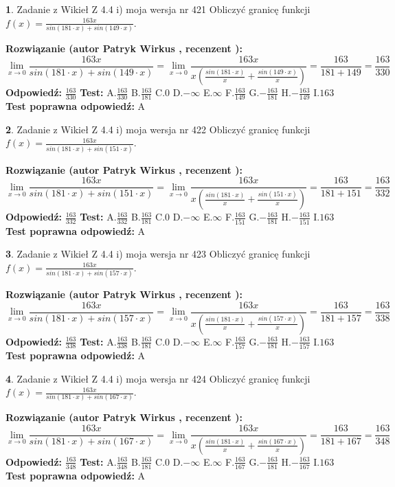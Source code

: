 \documentclass[12pt, a4paper]{article}
\theoremstyle{definition} %
\newtheorem{zad}{}
\newcommand{\zadStart}[1]{\begin{zad}#1\newline}
\newcommand{\zadStop}{\end{zad}}
\newcommand{\rozwStart}[2]{\noindent \textbf{Rozwiązanie (autor #1 , recenzent #2): }\newline}
\newcommand{\rozwStop}{\newline}
\newcommand{\odpStart}{\noindent \textbf{Odpowiedź:}\newline}
\newcommand{\odpStop}{\newline}
\newcommand{\testStart}{\noindent \textbf{Test:}\newline}
\newcommand{\testStop}{\newline}
\newcommand{\kluczStart}{\noindent \textbf{Test poprawna odpowiedź:}\newline}
\newcommand{\kluczStop}{\newline}
\begin{document}
\zadStart{Zadanie z Wikieł Z 4.4 i) moja wersja nr 421}
Obliczyć granicę funkcji $f(x)=\frac{163x}{sin(181\cdot x) +sin(149\cdot x)}$.
\zadStop
\rozwStart{Patryk Wirkus}{}
$$\lim\limits_{x\to 0}\frac{163x}{sin(181\cdot x) +sin(149\cdot x)}=\lim\limits_{x\to 0}\frac{163x}{x(\frac{sin(181\cdot x)}{x}+\frac{sin(149\cdot x)}{x})}=\frac{163}{181+149} = \frac{163}{330}$$
\rozwStop
\odpStart
$\frac{163}{330}$
\odpStop
\testStart
A.$\frac{163}{330}$
B.$\frac{163}{181}$
C.$0$
D.$-\infty$
E.$\infty$
F.$\frac{163}{149}$
G.$-\frac{163}{181}$
H.$-\frac{163}{149}$
I.$163$
\testStop
\kluczStart
A
\kluczStop



\zadStart{Zadanie z Wikieł Z 4.4 i) moja wersja nr 422}
Obliczyć granicę funkcji $f(x)=\frac{163x}{sin(181\cdot x) +sin(151\cdot x)}$.
\zadStop
\rozwStart{Patryk Wirkus}{}
$$\lim\limits_{x\to 0}\frac{163x}{sin(181\cdot x) +sin(151\cdot x)}=\lim\limits_{x\to 0}\frac{163x}{x(\frac{sin(181\cdot x)}{x}+\frac{sin(151\cdot x)}{x})}=\frac{163}{181+151} = \frac{163}{332}$$
\rozwStop
\odpStart
$\frac{163}{332}$
\odpStop
\testStart
A.$\frac{163}{332}$
B.$\frac{163}{181}$
C.$0$
D.$-\infty$
E.$\infty$
F.$\frac{163}{151}$
G.$-\frac{163}{181}$
H.$-\frac{163}{151}$
I.$163$
\testStop
\kluczStart
A
\kluczStop



\zadStart{Zadanie z Wikieł Z 4.4 i) moja wersja nr 423}
Obliczyć granicę funkcji $f(x)=\frac{163x}{sin(181\cdot x) +sin(157\cdot x)}$.
\zadStop
\rozwStart{Patryk Wirkus}{}
$$\lim\limits_{x\to 0}\frac{163x}{sin(181\cdot x) +sin(157\cdot x)}=\lim\limits_{x\to 0}\frac{163x}{x(\frac{sin(181\cdot x)}{x}+\frac{sin(157\cdot x)}{x})}=\frac{163}{181+157} = \frac{163}{338}$$
\rozwStop
\odpStart
$\frac{163}{338}$
\odpStop
\testStart
A.$\frac{163}{338}$
B.$\frac{163}{181}$
C.$0$
D.$-\infty$
E.$\infty$
F.$\frac{163}{157}$
G.$-\frac{163}{181}$
H.$-\frac{163}{157}$
I.$163$
\testStop
\kluczStart
A
\kluczStop



\zadStart{Zadanie z Wikieł Z 4.4 i) moja wersja nr 424}
Obliczyć granicę funkcji $f(x)=\frac{163x}{sin(181\cdot x) +sin(167\cdot x)}$.
\zadStop
\rozwStart{Patryk Wirkus}{}
$$\lim\limits_{x\to 0}\frac{163x}{sin(181\cdot x) +sin(167\cdot x)}=\lim\limits_{x\to 0}\frac{163x}{x(\frac{sin(181\cdot x)}{x}+\frac{sin(167\cdot x)}{x})}=\frac{163}{181+167} = \frac{163}{348}$$
\rozwStop
\odpStart
$\frac{163}{348}$
\odpStop
\testStart
A.$\frac{163}{348}$
B.$\frac{163}{181}$
C.$0$
D.$-\infty$
E.$\infty$
F.$\frac{163}{167}$
G.$-\frac{163}{181}$
H.$-\frac{163}{167}$
I.$163$
\testStop
\kluczStart
A
\kluczStop
\end{document}
